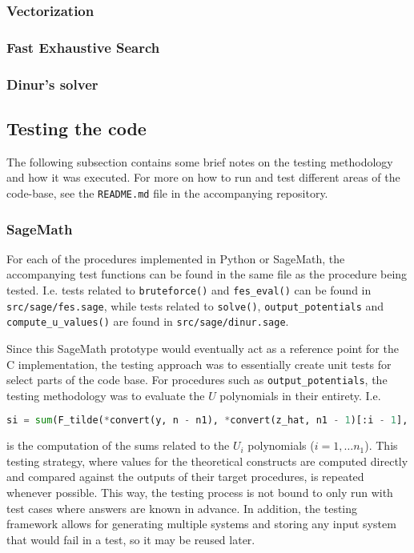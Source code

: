 \subsubsection{Vectorization}

\subsubsection{Fast Exhaustive Search}

\subsubsection{Dinur's solver}

\subsection{Testing the code}
The following subsection contains some brief notes on the testing methodology and how it was executed. For more on how to run and test different areas of the code-base, see the \texttt{README.md} file in the accompanying repository.

\subsubsection{SageMath}

For each of the procedures implemented in Python or SageMath, the accompanying test functions can be found in the same file as the procedure being tested. I.e. tests related to \texttt{bruteforce()} and \texttt{fes\_eval()} can be found in \texttt{src/sage/fes.sage}, while tests related to \texttt{solve()}, \texttt{output\_potentials} and \texttt{compute\_u\_values()} are found in \texttt{src/sage/dinur.sage}.

Since this SageMath prototype would eventually act as a reference point for the C implementation, the testing approach was to essentially create unit tests for select parts of the code base. For procedures such as \texttt{output\_potentials}, the testing methodology was to evaluate the $U$ polynomials in their entirety. I.e.
\begin{lstlisting}[language=Python,style=mystyle]
si = sum(F_tilde(*convert(y, n - n1), *convert(z_hat, n1 - 1)[:i - 1], 0, *convert(z_hat, n1 - 1)[i - 1:]) for z_hat in range(2^(n1 - 1)))
\end{lstlisting}
is the computation of the sums related to the $U_i$ polynomials ($i = 1, \dots n_1$). This testing strategy, where values for the theoretical constructs are computed directly and compared against the outputs of their target procedures, is repeated whenever possible. This way, the testing process is not bound to only run with test cases where answers are known in advance. In addition, the testing framework allows for generating multiple systems and storing any input system that would fail in a test, so it may be reused later.

